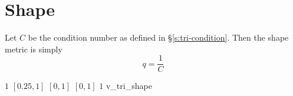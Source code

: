 \section{Shape\label{s:tri-shape}}

Let $C$ be the condition number as defined in \S\ref{s:tri-condition}.
Then the shape metric is simply
\[
  q = \frac{1}{C}
\]

%
{$1$}%
{$[0.25,1]$}%
{$[0,1]$}%
{$[0,1]$}%
{$1$}%
{\cite{knu:03}}%
{v\_tri\_shape}%

